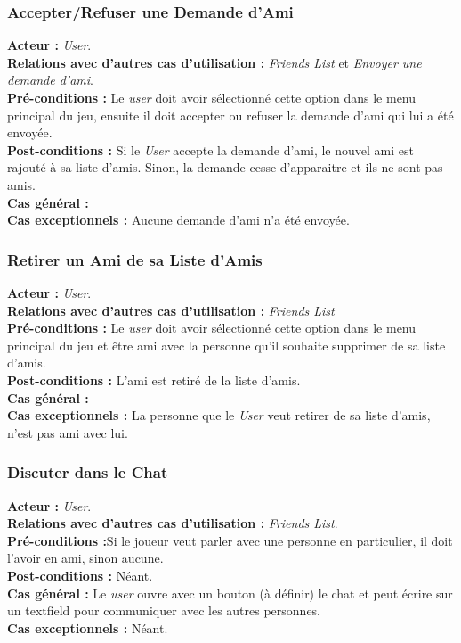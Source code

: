 \documentclass[10pt, a4paper]{article}
\begin{document}
\subsubsection{Accepter/Refuser une Demande d'Ami}
\textbf{Acteur :} \textit{User}.\\
\textbf{Relations avec d'autres cas d'utilisation :} \textit{Friends List} et \textit{Envoyer une demande d'ami}.\\
\textbf{Pré-conditions :} Le \textit{user} doit avoir sélectionné cette option dans le menu principal du jeu, ensuite il doit accepter ou refuser la demande d'ami qui lui a été envoyée. \\
\textbf{Post-conditions :} Si le \textit{User} accepte la demande d'ami, le nouvel ami est rajouté à sa liste d'amis. Sinon, la demande cesse d'apparaitre et ils ne sont pas amis. \\
\textbf{Cas général :} \\
\textbf{Cas exceptionnels :} Aucune demande d'ami n'a été envoyée.

\subsubsection{Retirer un Ami de sa Liste d'Amis}
\textbf{Acteur :} \textit{User}.\\
\textbf{Relations avec d'autres cas d'utilisation :} \textit{Friends List}\\
\textbf{Pré-conditions :} Le \textit{user} doit avoir sélectionné cette option dans le menu principal du jeu et être ami avec la personne qu'il souhaite supprimer de sa liste d'amis.\\
\textbf{Post-conditions :} L'ami est retiré de la liste d'amis.\\
\textbf{Cas général :} \\
\textbf{Cas exceptionnels :} La personne que le \textit{User} veut retirer de sa liste d'amis, n'est pas ami avec lui.

\subsubsection{Discuter dans le Chat}
\textbf{Acteur :} \textit{User}.\\
\textbf{Relations avec d'autres cas d'utilisation :} \textit{Friends List}.\\
\textbf{Pré-conditions :}Si le joueur veut parler avec une personne en particulier, il doit l'avoir en ami, sinon aucune.\\
\textbf{Post-conditions :} Néant.\\
\textbf{Cas général :} Le \textit{user} ouvre avec un bouton (à définir) le chat et peut écrire sur un textfield pour communiquer avec les autres personnes.\\ %
\textbf{Cas exceptionnels :} Néant.
\end{document}
